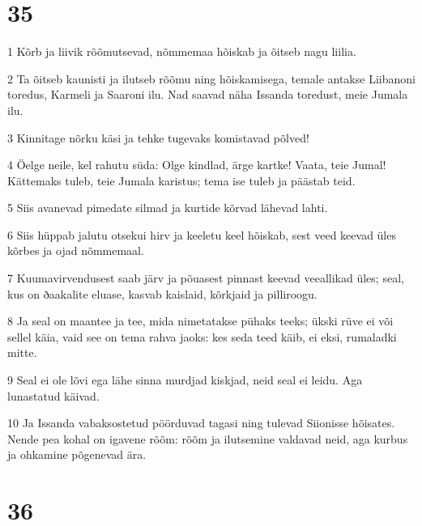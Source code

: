 \chapter{35}

\par 1 Kõrb ja liivik rõõmutsevad, nõmmemaa hõiskab ja õitseb nagu liilia.
\par 2 Ta õitseb kaunisti ja ilutseb rõõmu ning hõiskamisega, temale antakse Liibanoni toredus, Karmeli ja Saaroni ilu. Nad saavad näha Issanda toredust, meie Jumala ilu.
\par 3 Kinnitage nõrku käsi ja tehke tugevaks komistavad põlved!
\par 4 Öelge neile, kel rahutu süda: Olge kindlad, ärge kartke! Vaata, teie Jumal! Kättemaks tuleb, teie Jumala karistus; tema ise tuleb ja päästab teid.
\par 5 Siis avanevad pimedate silmad ja kurtide kõrvad lähevad lahti.
\par 6 Siis hüppab jalutu otsekui hirv ja keeletu keel hõiskab, sest veed keevad üles kõrbes ja ojad nõmmemaal.
\par 7 Kuumavirvendusest saab järv ja põuasest pinnast keevad veeallikad üles; seal, kus on ðaakalite eluase, kasvab kaislaid, kõrkjaid ja pilliroogu.
\par 8 Ja seal on maantee ja tee, mida nimetatakse pühaks teeks; ükski rüve ei või sellel käia, vaid see on tema rahva jaoks: kes seda teed käib, ei eksi, rumaladki mitte.
\par 9 Seal ei ole lõvi ega lähe sinna murdjad kiskjad, neid seal ei leidu. Aga lunastatud käivad.
\par 10 Ja Issanda vabaksostetud pöörduvad tagasi ning tulevad Siionisse hõisates. Nende pea kohal on igavene rõõm: rõõm ja ilutsemine valdavad neid, aga kurbus ja ohkamine põgenevad ära.

\chapter{36}

